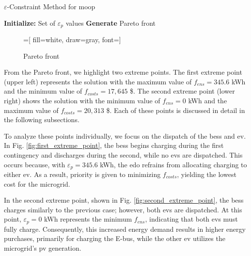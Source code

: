 \documentclass[preprint, 12pt, 3p]{elsarticle}
\begin{document}
\begin{algorithm}
    \caption{$\varepsilon$-Constraint Method for \gls{moop}}
    \label{alg:e_constraint_method}
    \SetAlgoLined
    \textbf{Initialize:} 
    Set of $\varepsilon_{p}$ values\;
    \textbf{Generate} Pareto front\;
\end{algorithm}

\begin{figure}
    \centering
    =[
    fill=white,
    draw=gray,
    font=\footnotesize]
    
    \vspace{-8pt}
    \caption{Pareto front}
    \label{fig:pareto_front}
\end{figure}


From the Pareto front, we highlight two extreme points. The first extreme 
point (upper left) represents the solution with the maximum value of
$f_{ens} = 345.6$ kWh and the minimum value of $f_{costs} = 17,645$ \$. The second 
extreme point (lower right) shows the solution with the minimum value 
of $f_{ens} = 0$ kWh and the maximum value of $f_{costs} = 20,313$ \$. Each of these points is discussed in detail in the following subsections.

To analyze these points individually, we focus on the dispatch of the \gls{bess} and \gls{ev}. 
In Fig. \ref{fig:first_extreme_point}, the \gls{bess} begins charging during the first
contingency and discharges during the second, while no \glspl{ev} are dispatched. This occurs because, with $\varepsilon_{p} = 345.6$ kWh, the \gls{edo} refrains from allocating charging to either \gls{ev}. As a result, priority is given to minimizing $f_{costs}$, yielding the lowest 
cost for the microgrid.

In the second extreme point, shown in Fig. \ref{fig:second_extreme_point}, the 
\gls{bess} charges similarly to the previous case; however, both \glspl{ev} are dispatched. 
At this point, $\varepsilon_{p} = 0$ kWh represents the minimum $f_{ens}$, indicating that 
both \glspl{ev} must fully charge. Consequently, this increased energy demand results in higher energy purchases, primarily for charging the E-bus, while the other \gls{ev} utilizes the microgrid’s \gls{pv} generation.
\end{document}
